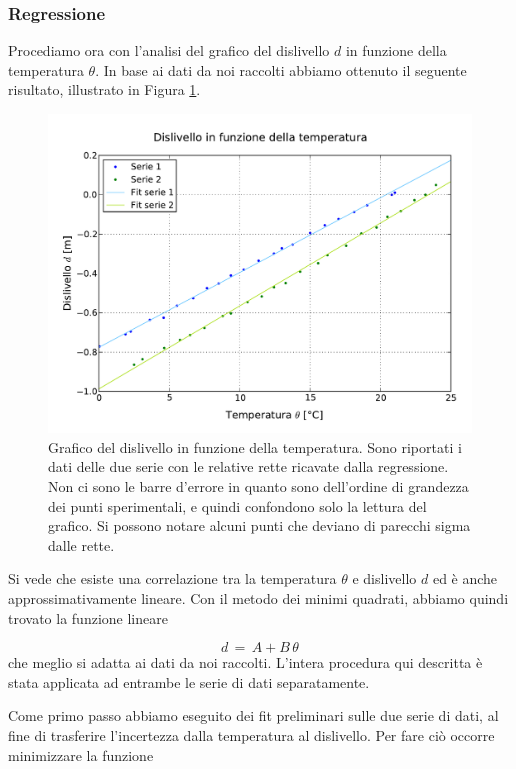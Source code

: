 \subsubsection{Regressione}
\label{reg_1}

Procediamo ora con l'analisi del grafico del dislivello $d$ in funzione della temperatura $\theta$.
In base ai dati da noi raccolti abbiamo ottenuto il seguente risultato, illustrato in Figura \ref{fig:dislivello_temperatura}.

\begin{figure}
    \centering
    \includegraphics[width=120mm]{immagini/dislivello_temperatura.pdf}
    \caption{Grafico del dislivello in funzione della temperatura. Sono riportati i dati delle due serie con le relative
    rette ricavate dalla regressione. Non ci sono le barre d'errore in quanto sono dell'ordine di grandezza dei punti
    sperimentali, e quindi confondono solo la lettura del grafico. Si possono notare alcuni punti che deviano di parecchi
    sigma dalle rette.}
    \label{fig:dislivello_temperatura}
\end{figure}
%
Si vede che esiste una correlazione tra la temperatura $\theta$ e dislivello $d$ ed è anche approssimativamente lineare.
Con il metodo dei minimi quadrati, abbiamo quindi trovato la funzione lineare

\begin{equation}
d \,=\, A + B\,\theta
\label{h_theta}
\end{equation}
%
che meglio si adatta ai dati da noi raccolti. L'intera procedura qui descritta è stata
applicata ad entrambe le serie di dati separatamente.

Come primo passo abbiamo eseguito dei fit preliminari sulle due serie di dati,
al fine di trasferire l'incertezza dalla temperatura al dislivello.
Per fare ciò occorre minimizzare la funzione

